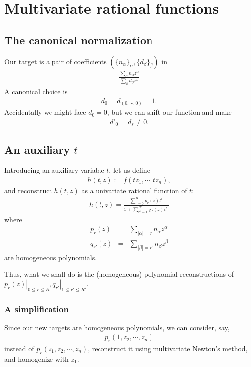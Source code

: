\documentclass[11pt]{book}
\begin{document}
\section{Multivariate rational functions}
\subsection{The canonical normalization}
Our target is a pair of coefficients $(\{ n_\alpha\}_\alpha, \{ d_\beta\}_\beta)$ in
\begin{eqnarray}
\frac{\sum_\alpha n_\alpha z^\alpha}{\sum_\beta d_\beta z^\beta}
\end{eqnarray}
A canonical choice is
\begin{eqnarray}
d_0 = d_{(0,\cdots,0)} = 1.
\end{eqnarray}
Accidentally we might face $d_0 = 0$, but we can shift our function and make
\begin{eqnarray}
d'_0 = d_{s} \neq 0.
\end{eqnarray}

\subsection{An auxiliary $t$}
Introducing an auxiliary variable $t$, let us define
\begin{eqnarray}
h(t,z) := f(tz_1, \cdots, tz_n),
\end{eqnarray}
and reconstruct $h(t,z)$ as a univariate rational function of $t$:
\begin{eqnarray}
h(t,z) = \frac{\sum_{r=0}^R p_r(z) t^r}{1+ \sum_{r'=1}^{R'} q_{r'}(z) t^{r'}}
\end{eqnarray}
where
\begin{eqnarray}
p_r(z) &=& \sum_{|\alpha| = r} n_\alpha z^\alpha \\
q_{r'}(z) &=& \sum_{|\beta| = r'} n_\beta z^\beta
\end{eqnarray}
are homogeneous polynomials.

Thus, what we shall do is the (homogeneous) polynomial reconstructions of $\left. p_r(z) \right|_{0 \leq r \leq R}, \left. q_{r'} \right|_{1 \leq r' \leq R'}$.

\subsubsection{A simplification}
Since our new targets are homogeneous polynomials, we can consider, say,
\begin{eqnarray}
p_r(1, z_2, \cdots, z_n)
\end{eqnarray}
instead of $p_r(z_1, z_2, \cdots, z_n)$, reconstruct it using multivariate Newton's method, and homogenize with $z_1$.
\end{document}
